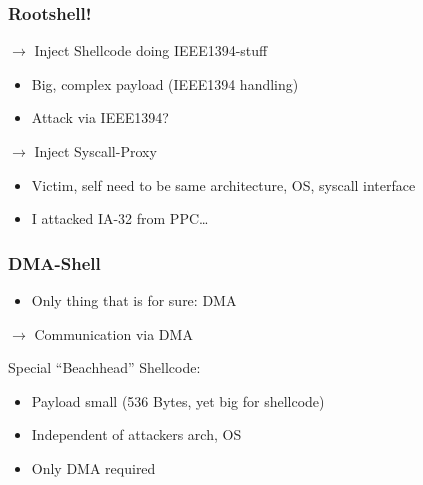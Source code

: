 \documentclass{beamer}
\newenvironment{itemizeframe}[1]
  {\begin{frame}{#1}\startitemizeframe}
  {\stopitemizeframe\end{frame}}
\newcommand\startitemizeframe{\begin{itemize}}
\newcommand\stopitemizeframe{\end{itemize}}
\begin{document}
		\begin{frame} \frametitle{Rootshell!}
			$\rightarrow$ Inject Shellcode doing IEEE1394-stuff
			\begin{itemize}
				\item Big, complex payload (IEEE1394 handling)
				\item Attack via IEEE1394?
			\end{itemize}
			$\rightarrow$ Inject Syscall-Proxy
			\begin{itemize}
				\item Victim, self need to be same architecture, OS, syscall interface
				\item I attacked IA-32 from PPC\ldots
			\end{itemize}
		\end{frame}

		\begin{frame} \frametitle{DMA-Shell}
			\begin{itemize}
				\item Only thing that is for sure: DMA
			\end{itemize}
			$\rightarrow$ Communication via DMA
		\end{frame}
		

		\begin{frame}
			Special ``Beachhead'' Shellcode: \\
		\end{frame}
		
		\begin{itemizeframe}{}
			\item Payload small (536 Bytes, yet big for shellcode)
			\item Independent of attackers arch, OS
			\item Only DMA required
		\end{itemizeframe}
\end{document}
